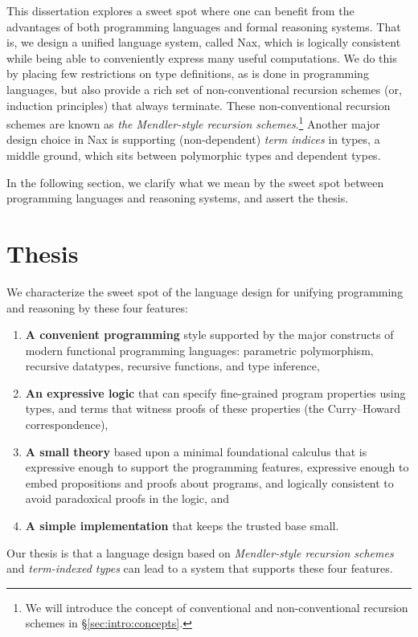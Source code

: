 This dissertation explores a sweet spot where one can benefit from
the advantages of both programming languages and formal reasoning systems.
That is, we design a unified language system, called Nax, which is
logically consistent while being able to conveniently express
many useful computations. We do this by placing few restrictions
on type definitions, as is done in programming languages, but also
provide a rich set of non-conventional recursion schemes
(or, induction principles) that always terminate.
These non-conventional recursion schemes are known as
\emph{the Mendler-style recursion schemes}.\footnote{
	We will introduce the concept of conventional and
	non-conventional recursion schemes in \S\ref{sec:intro:concepts}.}
Another major design choice in Nax is supporting (non-dependent)
\emph{term indices} in types, a middle ground, which sits between
polymorphic types and dependent types.

In the following section, we clarify what we mean by the sweet spot between
programming languages and reasoning systems, and assert the thesis.

\section{Thesis}\label{sec:intro:thesis}
We characterize the sweet spot of the language design for unifying
programming and reasoning by these four features:
\begin{enumerate}[(1)]
 \item \textbf{A convenient programming} style
         supported by the major constructs of
         modern functional programming languages: 
         parametric polymorphism, recursive datatypes,
         recursive functions, and type inference,

 \item \textbf{An expressive logic} that can specify
         fine-grained program properties using types,
         and terms that witness proofs of these properties 
         (the Curry--Howard correspondence),

 \item \textbf{A small theory} based upon a minimal foundational calculus
         that is expressive enough to support the programming features,
         expressive enough to embed propositions and proofs about programs,
         and logically consistent to avoid paradoxical proofs in the logic, and

 \item \textbf{A simple implementation} that keeps the trusted base small.
\end{enumerate}
Our thesis is
that a language design based on \emph{Mendler-style recursion schemes}
and \emph{term-indexed types} can lead to a system that supports these four
features.

